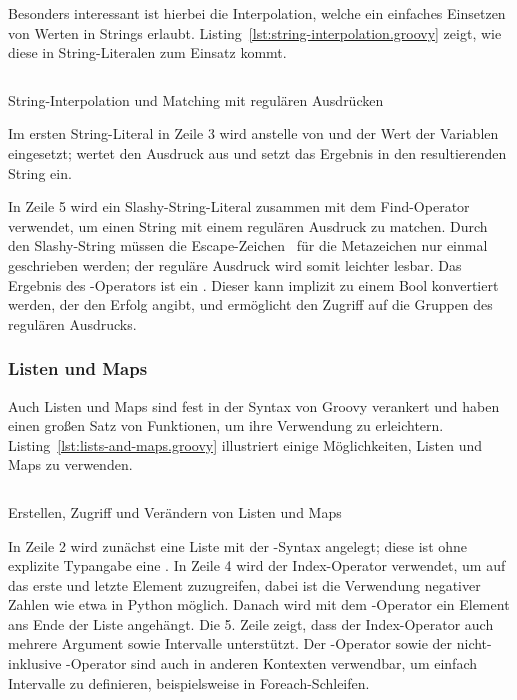 \documentclass[a4paper]{article}
\newcommand{\codelisting}[3]{
\begin{listing}[ht]
	\inputminted{#1}{#1/#2}
	\caption{#3}
	\label{lst:#2}
\end{listing}
}
\begin{document}
Besonders interessant ist hierbei die Interpolation, welche ein einfaches Einsetzen von Werten in Strings erlaubt.
Listing~\ref{lst:string-interpolation.groovy} zeigt, wie diese in String-Literalen zum Einsatz kommt.

\codelisting{groovy}{string-interpolation.groovy}{String-Interpolation und Matching mit regulären Ausdrücken}

Im ersten String-Literal in Zeile 3 wird anstelle von  und  der Wert der Variablen eingesetzt;
 wertet den Ausdruck  aus und setzt das Ergebnis in den resultierenden String ein.

In Zeile 5 wird ein Slashy-String-Literal zusammen mit dem Find-Operator \code{=~} verwendet, um einen String mit einem regulären Ausdruck zu matchen.
Durch den Slashy-String müssen die Escape-Zeichen~\plain{\ } für die Metazeichen nur einmal geschrieben werden; der reguläre Ausdruck wird somit leichter lesbar.
Das Ergebnis des \code{=~}-Operators ist ein .
Dieser kann implizit zu einem Bool konvertiert werden, der den Erfolg angibt, und ermöglicht den Zugriff auf die Gruppen des regulären Ausdrucks.

\subsubsection{Listen und Maps}\label{subsubsec:listen-und-maps}

Auch Listen und Maps sind fest in der Syntax von Groovy verankert und haben einen großen Satz von Funktionen, um ihre Verwendung zu erleichtern.
Listing~\ref{lst:lists-and-maps.groovy} illustriert einige Möglichkeiten, Listen und Maps zu verwenden.

\codelisting{groovy}{lists-and-maps.groovy}{Erstellen, Zugriff und Verändern von Listen und Maps}

In Zeile 2 wird zunächst eine Liste mit der \code{[]}-Syntax angelegt;
diese ist ohne explizite Typangabe eine .
In Zeile 4 wird der Index-Operator verwendet, um auf das erste und letzte Element zuzugreifen, dabei ist die Verwendung negativer Zahlen wie etwa in Python möglich.
Danach wird mit dem \code{<<}-Operator ein Element ans Ende der Liste angehängt.
Die 5. Zeile zeigt, dass der Index-Operator auch mehrere Argument sowie Intervalle unterstützt.
Der -Operator sowie der nicht-inklusive -Operator sind auch in anderen Kontexten verwendbar, um einfach Intervalle zu definieren, beispielsweise in Foreach-Schleifen.
\end{document}
